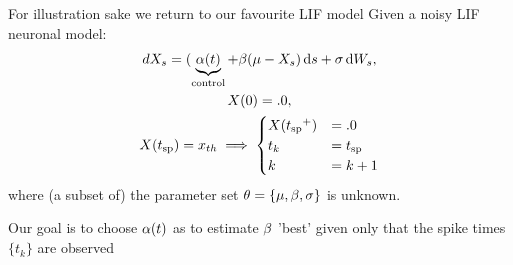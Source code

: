 For illustration sake we return to our favourite LIF model
Given a noisy LIF neuronal model:
\begin{equation}
\begin{gathered}
dX_s = (\underbrace{\a(t)}_{\textrm{control}} + \b(\m %
 - {X_s} ) \intd{s} + \s\intd{W_s},
\\
X(0) = .0,
\\
X(\ts) = \xth \implies  
\begin{cases}
X(\ts^+) &= .0   
\\
t_k &=  \ts
\\
k  &= k+1
\end{cases}
\end{gathered}
\label{eq:X_evolution_uo}
\end{equation}
where (a subset of) the parameter set ${ \theta} = \{{\mu }, \beta, \sigma\}$ is unknown.

Our goal is to choose $\alpha(t)$ as to estimate $\beta$ 'best' given only that the
spike times $\{t_k\}$ are observed 
 
